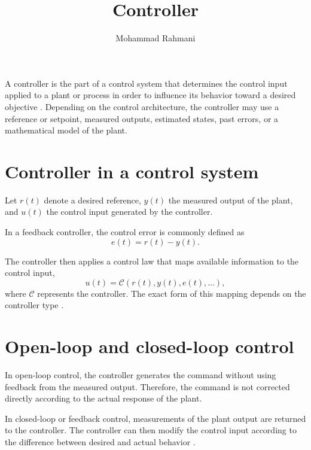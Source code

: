 \documentclass[a4paper]{article}
\title{Controller}
\date{}
\author{Mohammad Rahmani}
\begin{document}
   \maketitle

   A controller is the part of a control system that determines the control input applied to a plant or process in order to influence its behavior toward a desired objective \cite{astrom-2008-feedback-systems-an-introduction-for-scientists-and-engineers}. Depending on the control architecture, the controller may use a reference or setpoint, measured outputs, estimated states, past errors, or a mathematical model of the plant.

   \section{Controller in a control system}
      Let $r(t)$ denote a desired reference, $y(t)$ the measured output of the plant, and $u(t)$ the control input generated by the controller.

      In a feedback controller, the control error is commonly defined as
      \[
         e(t)=r(t)-y(t).
      \]

      The controller then applies a control law that maps available information to the control input,
      \[
         u(t)=\mathcal{C}(r(t),y(t),e(t),\ldots),
      \]
      where $\mathcal{C}$ represents the controller. The exact form of this mapping depends on the controller type \cite{astrom-2008-feedback-systems-an-introduction-for-scientists-and-engineers}.

   \section{Open-loop and closed-loop control}
      In open-loop control, the controller generates the command without using feedback from the measured output. Therefore, the command is not corrected directly according to the actual response of the plant.

      In closed-loop or feedback control, measurements of the plant output are returned to the controller. The controller can then modify the control input according to the difference between desired and actual behavior \cite{astrom-2008-feedback-systems-an-introduction-for-scientists-and-engineers}.

\end{document}
